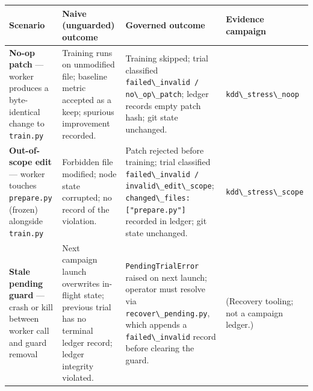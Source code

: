 \begin{table}[t]
\small
\begin{tabular}{@{}
  >{\raggedright\arraybackslash}p{}
  >{\raggedright\arraybackslash}p{}
  >{\raggedright\arraybackslash}p{}
  >{\raggedright\arraybackslash}p{}@{}}
\toprule
\begin{minipage}[b]{\linewidth}\raggedright
Scenario
\end{minipage} & \begin{minipage}[b]{\linewidth}\raggedright
Naive (unguarded) outcome
\end{minipage} & \begin{minipage}[b]{\linewidth}\raggedright
Governed outcome
\end{minipage} & \begin{minipage}[b]{\linewidth}\raggedright
Evidence campaign
\end{minipage} \\
\midrule
\bottomrule
\textbf{No-op patch} --- worker produces a byte-identical change to \passthrough{\lstinline!train.py!} & Training runs on unmodified file; baseline metric accepted as a keep; spurious improvement recorded. & Training skipped; trial classified \passthrough{\lstinline!failed\_invalid / no\_op\_patch!}; ledger records empty patch hash; git state unchanged. & \passthrough{\lstinline!kdd\_stress\_noop!} \\
\textbf{Out-of-scope edit} --- worker touches \passthrough{\lstinline!prepare.py!} (frozen) alongside \passthrough{\lstinline!train.py!} & Forbidden file modified; node state corrupted; no record of the violation. & Patch rejected before training; trial classified \passthrough{\lstinline!failed\_invalid / invalid\_edit\_scope!}; \passthrough{\lstinline!changed\_files: ["prepare.py"]!} recorded in ledger; git state unchanged. & \passthrough{\lstinline!kdd\_stress\_scope!} \\
\textbf{Stale pending guard} --- crash or kill between worker call and guard removal & Next campaign launch overwrites in-flight state; previous trial has no terminal ledger record; ledger integrity violated. & \passthrough{\lstinline!PendingTrialError!} raised on next launch; operator must resolve via \passthrough{\lstinline!recover\_pending.py!}, which appends a \passthrough{\lstinline!failed\_invalid!} record before clearing the guard. & (Recovery tooling; not a campaign ledger.) \\
\end{tabular}
\end{table}

